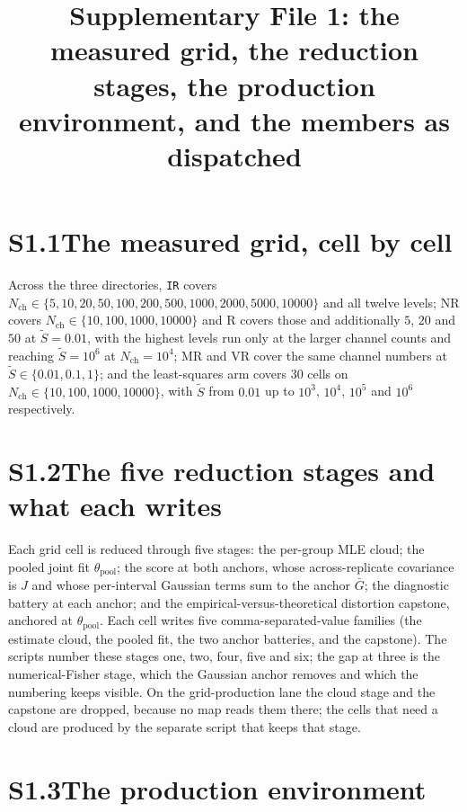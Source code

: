 \documentclass[11pt]{article}
\title{Supplementary File 1: the measured grid, the reduction stages, the production environment,
and the members as dispatched}
\author{}
\date{}
\begin{document}
\maketitle

\section*{S1.1\quad The measured grid, cell by cell}

Across the three directories, \texttt{IR} covers
$N_{\mathrm{ch}} \in \{5, 10, 20, 50, 100, 200, 500, 1000, 2000, 5000, 10000\}$ and
all twelve levels; NR covers
$N_{\mathrm{ch}} \in \{10, 100, 1000, 10000\}$ and R covers those and additionally
$5$, $20$ and $50$ at $\widetilde{S} = 0.01$, with the highest levels run only at the larger
channel counts and reaching $\widetilde{S} = 10^6$ at $N_{\mathrm{ch}} = 10^4$; MR and
VR cover the same channel numbers at $\widetilde{S} \in \{0.01, 0.1, 1\}$; and the least-squares arm
covers $30$ cells on $N_{\mathrm{ch}} \in \{10, 100, 1000, 10000\}$, with $\widetilde{S}$ from
$0.01$ up to $10^3$, $10^4$, $10^5$ and $10^6$ respectively.

\section*{S1.2\quad The five reduction stages and what each writes}

Each grid cell is reduced through five stages: the per-group MLE cloud; the pooled
joint fit $\theta_{\mathrm{pool}}$; the score at both anchors, whose
across-replicate covariance is $J$ and whose per-interval Gaussian terms sum to the
anchor $\bar G$; the diagnostic battery at each anchor; and the
empirical-versus-theoretical distortion capstone, anchored at
$\theta_{\mathrm{pool}}$. Each cell writes five comma-separated-value families (the
estimate cloud, the pooled fit, the two anchor batteries, and the capstone). The
scripts number these stages one, two, four, five and six; the gap at three is the
numerical-Fisher stage, which the Gaussian anchor removes and which the numbering
keeps visible. On the grid-production lane the cloud stage and the capstone are
dropped, because no map reads them there; the cells that need a cloud are produced
by the separate script that keeps that stage.

\section*{S1.3\quad The production environment}
\end{document}
